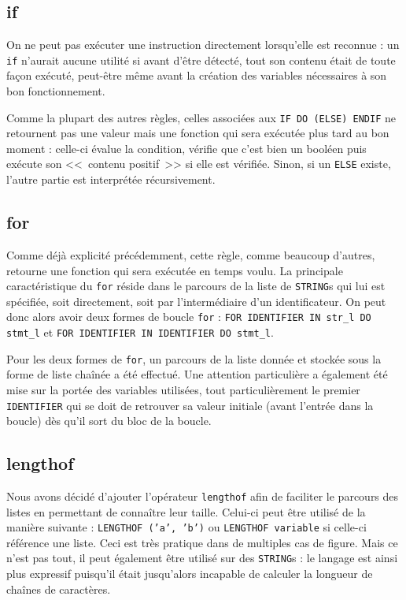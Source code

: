 \documentclass[12pt,twocolumn]{article}
\begin{document}
\subsection{if}
On ne peut pas exécuter une instruction directement lorsqu'elle est reconnue :
un \texttt{if} n'aurait aucune utilité si avant d'être détecté, tout son contenu
était de toute façon exécuté, peut-être même avant la création des variables
nécessaires à son bon fonctionnement.

Comme la plupart des autres règles, celles associées aux
\texttt{IF DO (ELSE) ENDIF} ne retournent pas une valeur mais une fonction
qui sera exécutée plus tard au bon moment : celle-ci évalue la condition,
vérifie que c'est bien un booléen puis exécute son <<~contenu positif~>>
si elle est vérifiée. Sinon, si un \texttt{ELSE} existe, l'autre partie est
interprétée récursivement.


\subsection{for}
Comme déjà explicité précédemment, cette règle, comme beaucoup d'autres,
retourne une fonction qui sera exécutée en temps voulu. La principale
caractéristique du \texttt{for} réside dans le parcours de la liste de
\texttt{STRING}s qui lui est spécifiée, soit directement, soit par
l'intermédiaire d'un identificateur. On peut donc alors avoir deux formes de
boucle \texttt{for} : \texttt{FOR IDENTIFIER IN str\_l DO stmt\_l} et
\texttt{FOR IDENTIFIER IN IDENTIFIER DO stmt\_l}.

Pour les deux formes de \texttt{for}, un parcours de la liste donnée et stockée
sous la forme de liste chaînée a été effectué. Une attention particulière a
également été mise sur la portée des variables utilisées, tout particulièrement
le premier \texttt{IDENTIFIER} qui se doit de retrouver sa valeur initiale
(avant l'entrée dans la boucle) dès qu'il sort du bloc de la boucle. 

\subsection{lengthof}
Nous avons décidé d'ajouter l'opérateur \texttt{lengthof} afin de faciliter le
parcours des listes en permettant de connaître leur taille. Celui-ci peut être
utilisé de la manière suivante :
\texttt{LENGTHOF ('a', 'b')} ou \texttt{LENGTHOF variable} si celle-ci
référence une liste. Ceci est très pratique dans de multiples cas de figure.
Mais ce n'est pas tout, il peut également être utilisé
sur des \texttt{STRING}s :
le langage est ainsi plus expressif puisqu'il était jusqu'alors incapable
de calculer la longueur de chaînes de caractères.
\end{document}
